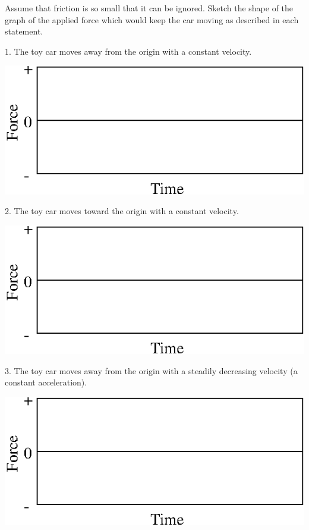 Assume that friction is so small that it can be ignored. Sketch the shape of
the graph of the applied force which would keep the car moving as described
in each statement.

1. The toy car moves away from the origin with a constant velocity.

\vspace{0.3cm}
{\par\centering \includegraphics{force2_fig7.eps} \par}
\vspace{0.3cm}

2. The toy car moves toward the origin with a constant velocity.

\vspace{0.3cm}
{\par\centering \includegraphics{force2_fig7.eps} \par}
\vspace{0.3cm}

3. The toy car moves away from the origin with a steadily decreasing velocity
(a constant acceleration).

\vspace{0.3cm}
{\par\centering \includegraphics{force2_fig7.eps} \par}
\vspace{0.3cm}

